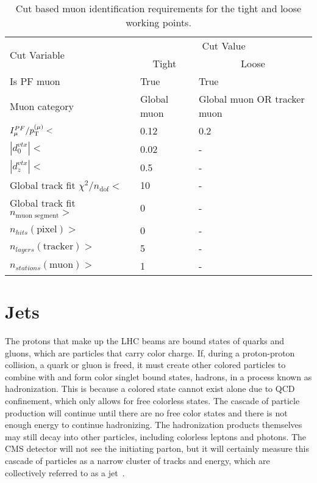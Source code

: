 \begin{table}[htbp]
    \caption{Cut based muon identification requirements for the tight and loose working points.}
    \centering
    \begin{tabular}{lll}
        \hline
        \multirow{2}{*}{Cut Variable}               & \multicolumn{2}{c}{Cut Value} \\\cline{2-3}
                                                    & \multicolumn{1}{c}{Tight}     & \multicolumn{1}{c}{Loose} \\\cline{2-3}
        \hline
        Is PF muon                                  & True        & True                        \\
        Muon category                               & Global muon & Global muon OR tracker muon \\
        $I_{\mu}^{PF}/p_{\mathrm{T}}^{(\mu)}<$                 & 0.12        & 0.2                         \\
        $|d_{0}^{vtx}|<$                            & 0.02        & -                           \\
        $|d_{z}^{vtx}|<$                            & 0.5         & -                           \\
        Global track fit $\chi^{2}/n_{\text{dof}}<$ & 10          & -                           \\
        Global track fit $n_\text{muon segment}>$   & 0           & -                           \\
        $n_{hits}\left(\text{pixel}\right)>$        & 0           & -                           \\
        $n_{layers}\left(\text{tracker}\right)>$    & 5           & -                           \\
        $n_{stations}\left(\text{muon}\right)>$     & 1           & -                           \\
        \hline
    \end{tabular}
    \label{tab:muon_id_cut}
\end{table}

\section{Jets}
\label{sec:jets}

The protons that make up the LHC beams are bound states of quarks and gluons, which are particles that carry color charge.
If, during a proton-proton collision, a quark or gluon is freed, it must create other colored particles to combine with and form color singlet bound states, hadrons, in a process known as hadronization.
This is because a colored state cannot exist alone due to QCD confinement, which only allows for free colorless states.
The cascade of particle production will continue until there are no free color states and there is not enough energy to continue hadronizing.
The hadronization products themselves may still decay into other particles, including colorless leptons and photons.
The CMS detector will not see the initiating parton, but it will certainly measure this cascade of particles as a narrow cluster of tracks and energy, which are collectively referred to as a jet~\cite{Salam:2009jx}.

